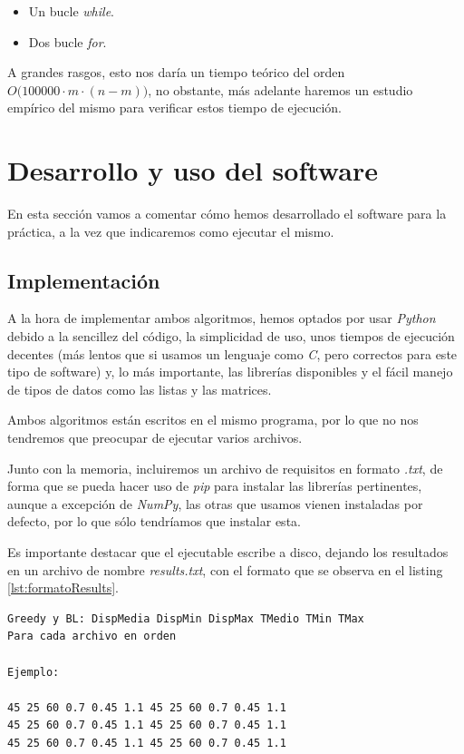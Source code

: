 \begin{itemize}
\item Un bucle \textit{while}.
\item Dos bucle \textit{for}.
\end{itemize}

A grandes rasgos, esto nos daría un tiempo teórico del orden $\displaystyle O \Big( 100000 \cdot m \cdot (n-m) \Big)$, no obstante, más adelante haremos un estudio empírico del mismo para verificar estos tiempo de ejecución.


\newpage

\section{Desarrollo y uso del software}

En esta sección vamos a comentar cómo hemos desarrollado el software para la práctica, a la vez que indicaremos como ejecutar el mismo.

\subsection{Implementación}

A la hora de implementar ambos algoritmos, hemos optados por usar \textit{Python} debido a la sencillez del código, la simplicidad de uso, unos tiempos de ejecución decentes (más lentos que si usamos un lenguaje como \textit{C}, pero correctos para este tipo de software) y, lo más importante, las librerías disponibles y el fácil manejo de tipos de datos como las listas y las matrices.

Ambos algoritmos están escritos en el mismo programa, por lo que no nos tendremos que preocupar de ejecutar varios archivos.

Junto con la memoria, incluiremos un archivo de requisitos en formato \textit{.txt}, de forma que se pueda hacer uso de \textit{pip} para instalar las librerías pertinentes, aunque a excepción de \textit{NumPy}, las otras que usamos vienen instaladas por defecto, por lo que sólo tendríamos que instalar esta.

Es importante destacar que el ejecutable escribe a disco, dejando los resultados en un archivo de nombre \textit{results.txt}, con el formato que se observa en el listing \ref{lst:formatoResults}.

\begin{lstlisting}[frame=single, caption={Formato del archivo results.txt}, captionpos=b, label=lst:formatoResults]
Greedy y BL: DispMedia DispMin DispMax TMedio TMin TMax
Para cada archivo en orden

Ejemplo:

45 25 60 0.7 0.45 1.1 45 25 60 0.7 0.45 1.1
45 25 60 0.7 0.45 1.1 45 25 60 0.7 0.45 1.1
45 25 60 0.7 0.45 1.1 45 25 60 0.7 0.45 1.1

\end{lstlisting}

